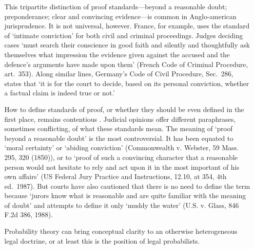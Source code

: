 \documentclass{article}
\begin{document}
This tripartite distinction of proof standards---beyond a reasonable doubt; preponderance; clear and convincing evidence---is common in Anglo-american jurisprudence. It is not universal, however. %
France, for example, uses the standard of `intimate conviction' for both civil and criminal proceedings. Judges deciding cases `must search their conscience in good
faith and silently and thoughtfully ask themselves what impression the evidence
given against the accused and the defence's arguments have made upon them' (French Code of Criminal Procedure, art.\ 353). %
Along similar lines, Germany's Code of Civil Procedure, Sec.\ 286, states that `it is for the court to decide, based on its personal conviction, whether a factual claim is indeed true or not.'
%
%


How to define standards of proof, or whether they should be even defined in the first place, remains  contentious \citep{diamond90,newman1993, Horowitz1996,laudan2006truth,walen2015}. Judicial opinions offer different paraphrases, sometimes conflicting, of what these standards mean. The meaning of `proof beyond a reasonable doubt' is the most controversial. It has been equated to `moral certainty' or `abiding conviction' (Commonwealth v. Webster, 59 Mass. 295, 320 (1850)), or to `proof of such a convincing character that a reasonable person would not hesitate to rely and act upon it in the most important of his own affairs' (US Federal Jury Practice and Instructions, 12.10, at 354, 4th ed.\ 1987). But courts have also cautioned that there is no need to define the term because `jurors know what is reasonable and are quite familiar with the meaning of doubt' and attempts to define it only `muddy the water' (U.S. v. Glass, 846 F.2d 386, 1988).

Probability theory can bring conceptual clarity 
to an otherwise heterogeneous legal doctrine, 
or at least this is the position of legal probabilists.
\end{document}
